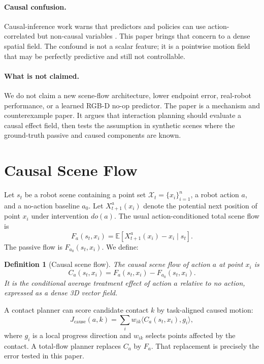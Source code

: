 \documentclass{article}
\newtheorem{definition}{Definition}
\newcommand{\noop}{a_0}
\newcommand{\points}{\mathcal{X}}
\begin{document}
\paragraph{Causal confusion.}
Causal-inference work warns that predictors and policies can use action-correlated but
non-causal variables \citep{causalconfusion,pearl}.  This paper brings that concern to a
dense spatial field.  The confound is not a scalar feature; it is a pointwise motion field
that may be perfectly predictive and still not controllable.

\paragraph{What is not claimed.}
We do not claim a new scene-flow architecture, lower endpoint error, real-robot
performance, or a learned RGB-D no-op predictor.  The paper is a mechanism and
counterexample paper.  It argues that interaction planning should evaluate a causal
effect field, then tests the assumption in synthetic scenes where the ground-truth
passive and caused components are known.

\section{Causal Scene Flow}

Let $s_t$ be a robot scene containing a point set $\points_t=\{x_i\}_{i=1}^n$, a robot
action $a$, and a no-action baseline $\noop$.  Let $X^{a}_{t+1}(x_i)$ denote the
potential next position of point $x_i$ under intervention $do(a)$.  The usual
action-conditioned total scene flow is
\[
  F_a(s_t,x_i) =
  \mathbb{E}[X^{a}_{t+1}(x_i)-x_i \mid s_t].
\]
The passive flow is $F_{\noop}(s_t,x_i)$.  We define:

\begin{definition}[Causal scene flow]
The causal scene flow of action $a$ at point $x_i$ is
\[
  C_a(s_t,x_i) = F_a(s_t,x_i) - F_{\noop}(s_t,x_i).
\]
It is the conditional average treatment effect of action $a$ relative to no action,
expressed as a dense 3D vector field.
\end{definition}

A contact planner can score candidate contact $k$ by task-aligned caused motion:
\[
  J_{\mathrm{cause}}(a,k)=\sum_i w_{ik}\langle C_a(s_t,x_i),g_i\rangle,
\]
where $g_i$ is a local progress direction and $w_{ik}$ selects points affected by the
contact.  A total-flow planner replaces $C_a$ by $F_a$.  That replacement is precisely
the error tested in this paper.
\end{document}

